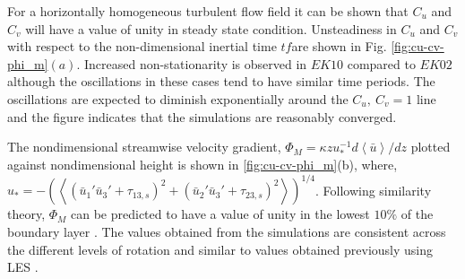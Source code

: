 \documentclass{amsart}
\begin{document}
\noindent For a horizontally homogeneous turbulent flow field it can be shown that $C_u$ and $C_v$ will have a value of unity in steady state \citep{book-garrat-blm} condition. Unsteadiness in $C_u$ and $C_v$ with respect to the non-dimensional inertial time $tf$are shown in Fig.  \ref{fig:cu-cv-phi_m}$(a)$. Increased non-stationarity is observed in $EK10$ compared to $EK02$ although the oscillations in these cases tend to have similar time periods. The oscillations are expected to diminish  exponentially around the  $C_{u},\ C_{v}=1$ line \citep{book-garrat-blm} and the figure indicates that the simulations are reasonably converged. 

The nondimensional streamwise velocity gradient, $\Phi_M=\kappa z u_*^{-1} d\left < \bar{u} \right >/dz$ plotted against nondimensional height is shown in \ref{fig:cu-cv-phi_m}(b), where, $u_*= -(\left < (\bar{u}_{1}'\bar{u}_{3}'+\tau_{13,s})^2 + ( \bar{u}_{2}'\bar{u}_{3}'+ \tau_{23,s})^2\right >)^{1/4}$. Following similarity theory, $\Phi_M$ can be predicted to have a value of unity in the lowest $10\%$ of the boundary layer \citep{stoll_blm_2006}. The values obtained from the simulations are consistent across the different levels of rotation and similar to values obtained previously using LES \citep{stoll_blm_2006,andren_brown_qjrm_94}. 
\end{document}
